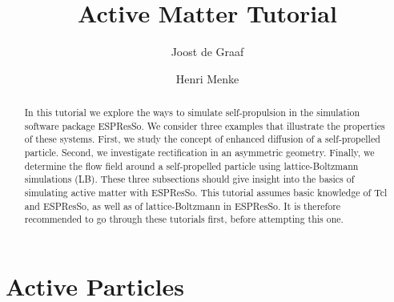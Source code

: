 \documentclass[aip,jcp,reprint,a4paper,onecolumn,amsmath]{revtex4-1}
\newcommand{\es}{\mbox{\textsf{ESPResSo}}\xspace}
\begin{document}
\title{Active Matter Tutorial}
\author{Joost de Graaf}
\author{Henri Menke}

\begin{abstract}
In this tutorial we explore the ways to simulate self-propulsion in the simulation software package \es{}. We consider three examples that illustrate the properties of these systems. First, we study the concept of enhanced diffusion of a self-propelled particle. Second, we investigate rectification in an asymmetric geometry. Finally, we determine the flow field around a self-propelled particle using lattice-Boltzmann simulations (LB). These three subsections should give insight into the basics of simulating active matter with \es{}. This tutorial assumes basic knowledge of Tcl and \es{}, as well as of lattice-Boltzmann in \es{}. It is therefore recommended to go through these tutorials first, before attempting this one.
\end{abstract}

\maketitle

\section{\label{sec:active}Active Particles}
\end{document}
